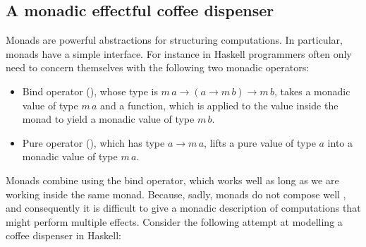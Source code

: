 \subsection{A monadic effectful coffee dispenser}\label{sec:problem-with-monads}
Monads are powerful abstractions for structuring computations. In particular, monads have a simple interface. For instance in Haskell programmers often only need to concern themselves with the following two monadic operators:
\begin{itemize}
  \item Bind operator (\code{>>=}), whose type is $m \, a \to (a \to m\, b) \to m \, b$, takes a monadic value of type $m \, a$ and a function, which is applied to the value inside the monad to yield a monadic value of type $m \, b$.
  \item Pure operator (), which has type $a \to m \, a$, lifts a pure value of type $a$ into a monadic value of type $m \, a$.
\end{itemize}
Monads combine using the bind operator, which works well as long as we are working inside the same monad. 
Because, sadly, monads do not compose well \cite{Kammar2013}, and consequently it is difficult to give a monadic description of computations that might perform multiple effects.
Consider the following attempt at modelling a coffee dispenser in Haskell:
